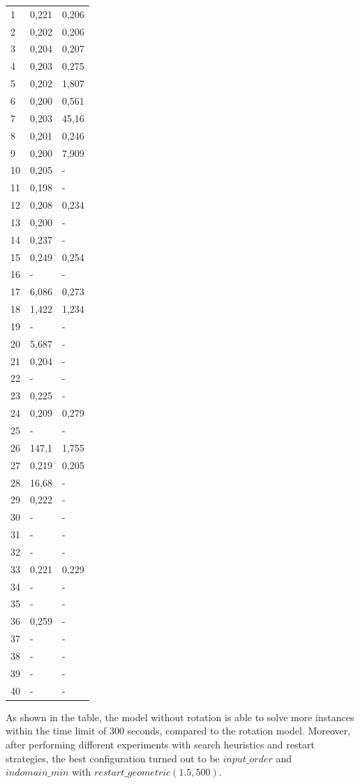 \begin{center}
\begin{longtable}{|l|l|l|}
1 & 0,221 & 0,206 \\
2 & 0,202 & 0,206 \\
3 & 0,204 & 0,207 \\
4 & 0,203 & 0,275 \\
5 & 0,202 & 1,807 \\
6 & 0,200 & 0,561 \\
7 & 0,203 & 45,16 \\
8 & 0,201 & 0,246 \\
9 & 0,200 & 7,909 \\
10 & 0,205 & - \\
11 & 0,198 & - \\
12 & 0,208 & 0,234 \\
13 & 0,200 & - \\
14 & 0,237 & - \\
15 & 0,249 & 0,254 \\
16 & - & - \\
17 & 6,086 & 0,273 \\
18 & 1,422 & 1,234 \\
19 & - & - \\
20 & 5,687 & - \\
21 & 0,204 & - \\
22 & - & - \\
23 & 0,225 & - \\
24 & 0,209 & 0,279 \\
25 & - & - \\
26 & 147,1 & 1,755 \\
27 & 0,219 & 0,205 \\
28 & 16,68 & - \\
29 & 0,222 & - \\
30 & - & - \\
31 & - & - \\
32 & - & - \\
33 & 0,221 & 0,229 \\
34 & - & - \\
35 & - & - \\
36 & 0,259 & - \\
37 & - & - \\
38 & - & - \\
39 & - & - \\
40 & - & - \\
\end{longtable}
\end{center}

As shown in the table, the model without rotation is able to solve more instances within the time limit of 300 seconds, compared to the rotation model. Moreover, after performing different experiments with search heuristics and restart strategies, the best configuration turned out to be $input\_order$ and $indomain\_min$ with $restart\_geometric(1.5,500)$.

